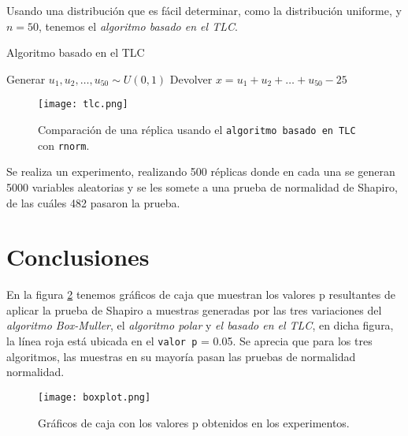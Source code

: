 \documentclass[12pt,letterpaper]{article}
\begin{document}
Usando una distribución que es fácil determinar, como la distribución uniforme, y $n=50$, tenemos el \textit{algoritmo basado en el TLC}.

\begin{algorithm}
  \caption{Algoritmo basado en el TLC}
  \begin{algorithmic}[1]
 
    \State Generar  $u_1, u_2, \ldots, u_{50} \sim U(0,1)$ 
    \State Devolver $x=u_1+u_2+\ldots + u_{50} - 25$ 

 
  \end{algorithmic}
\end{algorithm}

\begin{figure}
\centering
\texttt{[image: tlc.png]}
\caption{Comparación de una réplica usando el \texttt{algoritmo basado en TLC} con \texttt{rnorm}.} 	
\label{polar}
\end{figure} 

Se realiza un experimento, realizando 500 réplicas donde en cada una se generan 5000 variables aleatorias y se les somete a una prueba de normalidad de Shapiro, de las cuáles 482 pasaron la prueba. 

\section{Conclusiones}
En la figura \ref{boxplot} tenemos gráficos de caja que muestran los valores p resultantes de aplicar la prueba de Shapiro a muestras generadas por las tres variaciones del \textit{algoritmo Box-Muller}, el \textit{algoritmo polar} y \textit{el basado en el TLC}, en dicha figura, la línea roja está ubicada en el \texttt{valor p} = 0.05. Se aprecia que para los tres algoritmos, las muestras en su mayoría pasan las pruebas de normalidad normalidad.
\begin{figure}
\centering
\texttt{[image: boxplot.png]}
\caption{Gráficos de caja con los valores p obtenidos en los experimentos.} 	
\label{boxplot}
\end{figure} 

 

\end{document}
